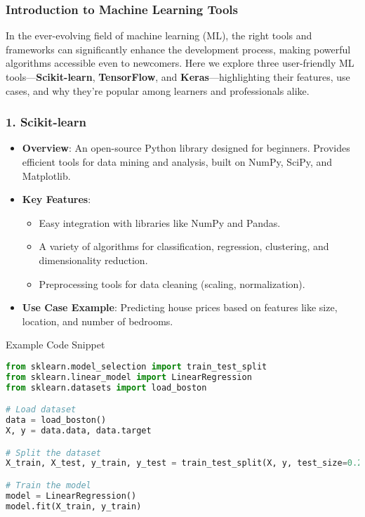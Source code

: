\documentclass[aspectratio=169]{beamer}
\begin{document}
\begin{frame}[fragile]
    \frametitle{Introduction to Machine Learning Tools}
    In the ever-evolving field of machine learning (ML), the right tools and frameworks can significantly enhance the development process, making powerful algorithms accessible even to newcomers. Here we explore three user-friendly ML tools—\textbf{Scikit-learn}, \textbf{TensorFlow}, and \textbf{Keras}—highlighting their features, use cases, and why they're popular among learners and professionals alike.
\end{frame}

\begin{frame}[fragile]
    \frametitle{1. Scikit-learn}
    \begin{itemize}
        \item \textbf{Overview}: An open-source Python library designed for beginners. Provides efficient tools for data mining and analysis, built on NumPy, SciPy, and Matplotlib.
        \item \textbf{Key Features}:
        \begin{itemize}
            \item Easy integration with libraries like NumPy and Pandas.
            \item A variety of algorithms for classification, regression, clustering, and dimensionality reduction.
            \item Preprocessing tools for data cleaning (scaling, normalization).
        \end{itemize}
        \item \textbf{Use Case Example}: Predicting house prices based on features like size, location, and number of bedrooms.
    \end{itemize}

    \begin{block}{Example Code Snippet}
    \begin{lstlisting}[language=Python]
from sklearn.model_selection import train_test_split
from sklearn.linear_model import LinearRegression
from sklearn.datasets import load_boston

# Load dataset
data = load_boston()
X, y = data.data, data.target

# Split the dataset
X_train, X_test, y_train, y_test = train_test_split(X, y, test_size=0.2, random_state=42)

# Train the model
model = LinearRegression()
model.fit(X_train, y_train)
    \end{lstlisting}
    \end{block}
\end{frame}
\end{document}

